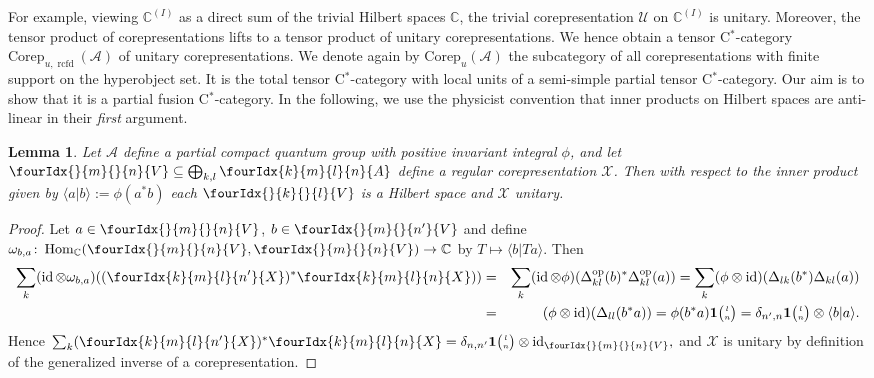 \documentclass[10pt]{article}
\DeclareMathOperator{\id}{id}
\DeclareMathOperator{\Hom}{Hom}
\DeclareMathOperator{\op}{\mathrm{op}}
\DeclareMathOperator{\rcf}{\mathrm{rcfd}}
\newcommand{\Corep}{\mathrm{Corep}}
\newcommand{\C}{\mathbb{C}}
\newcommand{\Grt}[3]{#1{\tiny {\begin{pmatrix} #2\\#3\end{pmatrix}}}}
\newcommand{\UnitC}[2]{\Grt{\mathbf{1}}{#1}{#2}}
\newcommand{\Gr}[5]{\fourIdx{#2}{#4}{#3}{#5}{#1}}%
\newcommand{\Gru}[3]{\Gr{#1}{}{}{#2}{#3}}
\newtheorem{Lem}[Theorem]{Lemma}
\theoremstyle{definition}
\numberwithin{equation}{section}
\begin{document}
For example, viewing $\C^{(I)}$ as a direct sum of the trivial Hilbert spaces $\C$, the
  trivial corepresentation $\mathscr{U}$ on $\C^{(I)}$ is unitary. Moreover, the tensor product of corepresentations lifts to a tensor product
of unitary corepresentations.  We hence obtain a tensor C$^*$-category $\Corep_{u,\rcf}(\mathscr{A})$ of unitary corepresentations. We denote again by $\Corep_u(\mathscr{A})$ the subcategory of all corepresentations with finite support on the hyperobject set. It is the total tensor C$^*$-category with local units of a semi-simple partial tensor C$^*$-category. Our aim is to show that it is a partial fusion C$^*$-category. In the following, we use the physicist convention that inner products on Hilbert spaces are anti-linear in their \emph{first} argument. 

\begin{Lem} \label{lemma:rep-regular-unitary}
  Let $\mathscr{A}$ define a partial compact quantum group with
positive invariant  integral $\phi$, and let $\Gru{V}{m}{n} \subseteq
\bigoplus_{k,l} \Gr{A}{k}{l}{m}{n}$ define a regular corepresentation $\mathscr{X}$. Then with
    respect to the inner product given by $\langle
    a|b\rangle:=\phi(a^{*}b)$ each $\Gru{V}{k}{l}$ is a Hilbert space and $\mathscr{X}$ unitary.
\end{Lem}
\begin{proof}   Let  $a\in \Gru{V}{m}{n}$, $b\in \Gru{V}{m}{n'}$ and define $\omega_{b,a} \colon
\Hom_{\C}(\Gru{V}{m}{n},\Gru{V}{m}{n}) \to \C$ by $T
\mapsto \langle b|Ta\rangle$. Then
\begin{eqnarray*}
\sum_{k }(\id \otimes \omega_{b,a})
((\Gr{X}{k}{l}{m}{n'})^* \Gr{X}{k}{l}{m}{n}))  &=& \sum_k
(\id\otimes \phi)(\Delta_{kl}^{\op}(b)^*\Delta_{kl}^{\op}(a))
  = \sum_k (\phi\otimes
  \id)(\Delta_{lk}(b^*)\Delta_{kl}(a)) \\ &=& (\phi\otimes
  \id)(\Delta_{ll}(b^*a))  = \phi(b^*a)\UnitC{l}{n} =
  \delta_{n',n} \UnitC{l}{n} \otimes \langle b|a\rangle.
\end{eqnarray*} Hence $ \sum_{k}
    (\Gr{X}{k}{l}{m}{n'})^* \Gr{X}{k}{l}{m}{n} =
    \delta_{n,n'}\UnitC{l}{n}\otimes
    \id_{\Gru{V}{m}{n}},$ and $\mathscr{X}$ is unitary by definition of the generalized inverse of a corepresentation.
\end{proof} 
\end{document}
